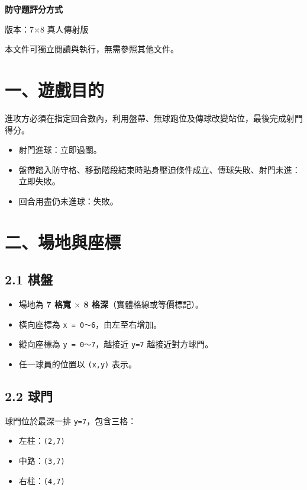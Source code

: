 \documentclass[11pt]{article}
\newcommand{\term}[1]{\textbf{#1}}
\newcommand{\coord}[1]{\texttt{#1}}
\begin{document}
{\LARGE\bfseries 防守題評分方式\par}
\vspace{0.4em}
{\large 版本：7$\times$8 真人傳射版\par}
\vspace{0.6em}
\noindent
本文件可獨立閱讀與執行，無需參照其他文件。

\section*{一、遊戲目的}

進攻方必須在指定回合數內，利用盤帶、無球跑位及傳球改變站位，最後完成射門得分。

\begin{itemize}
  \item 射門進球：立即過關。
  \item 盤帶踏入防守格、移動階段結束時貼身壓迫條件成立、傳球失敗、射門未進：立即失敗。
  \item 回合用盡仍未進球：失敗。
\end{itemize}

\section*{二、場地與座標}

\subsection*{2.1 棋盤}

\begin{itemize}
  \item 場地為 \term{7 格寬 $\times$ 8 格深}（實體格線或等價標記）。
  \item 橫向座標為 \coord{x = 0～6}，由左至右增加。
  \item 縱向座標為 \coord{y = 0～7}，越接近 \coord{y=7} 越接近對方球門。
  \item 任一球員的位置以 \coord{(x,y)} 表示。
\end{itemize}

\subsection*{2.2 球門}

球門位於最深一排 \coord{y=7}，包含三格：

\begin{itemize}
  \item 左柱：\coord{(2,7)}
  \item 中路：\coord{(3,7)}
  \item 右柱：\coord{(4,7)}
\end{itemize}
\end{document}
